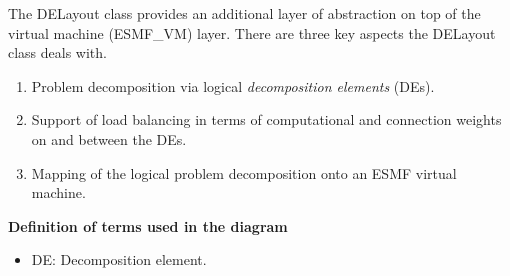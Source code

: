 

The DELayout class provides an additional layer of abstraction on top of the virtual machine (ESMF\_VM) layer. There are three key aspects the DELayout class deals with.

\begin{enumerate}

\item Problem decomposition via logical {\it decomposition elements} (DEs).

\item Support of load balancing in terms of computational and connection weights on and between the DEs. 

\item Mapping of the logical problem decomposition onto an ESMF virtual machine.

\end{enumerate}



{\bf Definition of terms used in the diagram}

\begin{itemize}

\item DE: Decomposition element.

\end{itemize}
